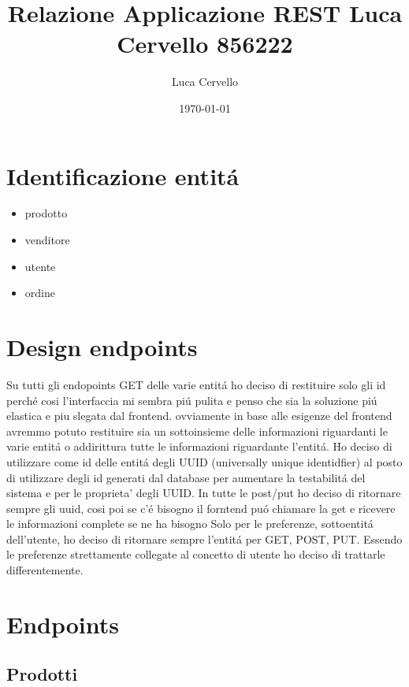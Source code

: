 \documentclass[11pt]{article}
\author{Luca Cervello}
\date{\today}
\title{Relazione Applicazione REST Luca Cervello 856222}
\begin{document}
\maketitle
\tableofcontents


\section{Identificazione entitá}
\label{sec:org0f30cfa}
\begin{itemize}
\item prodotto
\item venditore
\item utente
\item ordine
\end{itemize}
\section{Design endpoints}
\label{sec:org1c01714}
Su tutti gli endopoints GET delle varie entitá ho deciso di restituire solo gli id perché cosi l'interfaccia 
mi sembra piú pulita e penso che sia la soluzione piú elastica e piu slegata dal frontend.
ovviamente in base alle esigenze del frontend avremmo potuto restituire sia un sottoinsieme delle informazioni
riguardanti le varie entitá o addirittura tutte le informazioni riguardante l'entitá.
Ho deciso di utilizzare come id delle entitá degli UUID (universally unique identidfier) al posto di utilizzare 
degli id generati dal database per aumentare la testabilitá del sistema e per le proprieta' degli UUID.
In tutte le post/put ho deciso di ritornare sempre gli uuid, cosi poi se c'é bisogno il forntend puó chiamare
la get e ricevere le informazioni complete se ne ha bisogno
Solo per le preferenze, sottoentitá dell'utente, ho deciso di ritornare sempre l'entitá per GET, POST, PUT.
Essendo le preferenze strettamente collegate al concetto di utente ho deciso di trattarle differentemente.
\section{Endpoints}
\label{sec:org021c3d6}
\subsection{Prodotti}
\label{sec:org30690f9}
\end{document}
